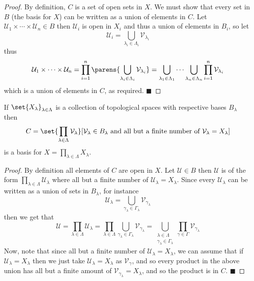 \documentclass[10pt]{article}
\def\qed{\hskip1cm\penalty-100\hbox{}\hfill$\blacksquare$}
\def\mU{\mathcal{U}}
\def\mV{\mathcal{V}}
\begin{document}
\begin{proof}

    By definition, $C$ is a set of open sets in $X$.
    We must show that every set in $B$ (the basis for $X$) can be written as a union of elements in $C$.
    Let $\mU_1\times\cdots\times\mU_n\in B$ then $\mU_i$ is open in $X_i$ and thus a union of elements in $B_i$, so let
    \[ \mU_i = \bigcup_{\lambda_i\in\Lambda_i}\mV_{\lambda_i} \]
    thus
    \[ \mU_1\times\cdots\times\mU_n = \prod_{i=1}^n\parens{\bigcup_{\lambda_i\in\Lambda_i}\mV_{\lambda_i}} =
    \bigcup_{\lambda_1\in\Lambda_1}\cdots\bigcup_{\lambda_n\in\Lambda_n}\prod_{i=1}^n\mV_{\lambda_i} \]
    which is a union of elements in $C$, as required.
    \qed

\end{proof}

\begin{prop*}

    If $\set{X_\lambda}_{\lambda\in\Lambda}$ is a collection of topological spaces with respective bases $B_\lambda$ then
    \[ C = \set{\prod_{\lambda\in\Lambda}\mV_\lambda}[\mV_\lambda\in B_\lambda\text{ and all but a finite number of }\mV_\lambda=X_\lambda] \]
    is a basis for $X=\prod_{\lambda\in\Lambda}X_\lambda$.

\end{prop*}

\begin{proof}

    By definition all elements of $C$ are open in $X$.
    Let $\mU\in B$ then $\mU$ is of the form $\prod_{\lambda\in\Lambda}\mU_\lambda$ where all but a finite number of $\mU_\lambda=X_\lambda$.
    Since every $\mU_\lambda$ can be written as a union of sets in $B_\lambda$, for instance
    \[ \mU_\lambda = \bigcup_{\gamma_\lambda\in\Gamma_\lambda}\mV_{\gamma_\lambda} \]
    then we get that
    \[ \mU=\prod_{\lambda\in\Lambda}\mU_\lambda=\prod_{\lambda\in\Lambda}\bigcup_{\gamma_\lambda\in\Gamma_\lambda}\mV_{\gamma_\lambda} =
    \bigcup_{\substack{\lambda\in\Lambda\\\gamma_\lambda\in\Gamma_\lambda}}\prod_{\gamma\in\Gamma}\mV_{\gamma_\lambda} \]
    Now, note that since all but a finite number of $\mU_\lambda=X_\lambda$, we can assume that if $\mU_\lambda=X_\lambda$ then we just take $\mU_\lambda=X_\lambda$ as $\mV_\gamma$, and so every product in
    the above union has all but a finite amount of $\mV_{\gamma_\lambda}=X_\lambda$, and so the product is in $C$.
    \qed

\end{proof}
\end{document}
